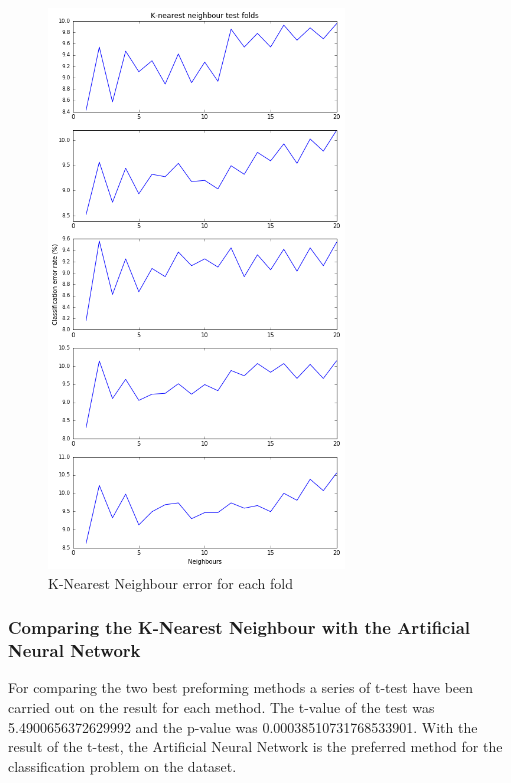 \vspace{-5pt}
\begin{figure}[!ht]
	\centering
	\includegraphics[width=0.7\textwidth]{Fig/classification_KNN}
	\vspace{-5pt}
	\caption{K-Nearest Neighbour error for each fold}
	\label{fig:classification_KNN}
\end{figure}

\subsubsection{Comparing the K-Nearest Neighbour with the Artificial Neural Network}
For comparing the two best preforming methods a series of t-test have been carried out on the result for each method. The t-value of the test was 5.4900656372629992 and the p-value was 0.00038510731768533901. With the result of the t-test, the Artificial Neural Network is the preferred method for the classification problem on the dataset. 